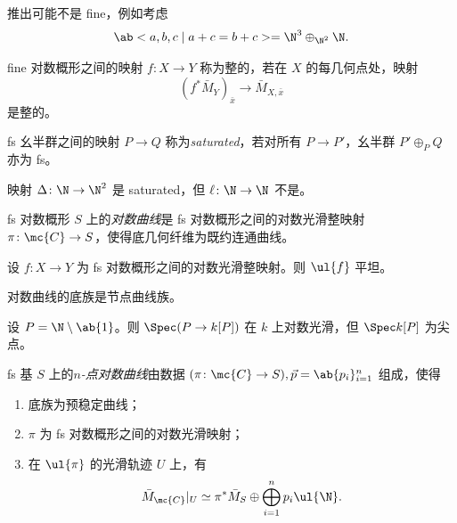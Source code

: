 \begin{exm}
    推出可能不是 fine，例如考虑
    \[ \ab< a ,b,c \mid a+c=b+c> = \N^3 \oplus_{\N^2} \N. \]
\end{exm}

\begin{defn}
    fine 对数概形之间的映射 \(f \colon X \to Y\) 称为整的，若在 \(X\) 的每几何点处，映射
    \[ (f^*\bar{M}_Y)_{\bar{x}} \to \bar{M}_{X,\bar{x}} \]
    是整的。
\end{defn}

\begin{defn}
    fs 幺半群之间的映射 \(P \to Q\) 称为\textit{saturated}，若对所有 \(P \to P'\)，幺半群 \(P' \oplus_P Q\) 亦为 fs。
\end{defn}

\begin{exm}
    映射 \(\Delta \colon \N \to \N^2\) 是 saturated，但 \(\ell \colon \N \to \N\) 不是。
\end{exm}

\begin{defn}
    fs 对数概形 \(S\) 上的\textit{对数曲线}是 fs 对数概形之间的对数光滑整映射 \(\pi \colon \mc{C} \to S\)，使得底几何纤维为既约连通曲线。
\end{defn}

\begin{prop}
    设 \(f \colon X \to Y\) 为 fs 对数概形之间的对数光滑整映射。则 \(\ul{f}\) 平坦。
\end{prop}

\begin{thm}
    对数曲线的底族是节点曲线族。
\end{thm}

\begin{exm}
    设 \(P = \N \setminus \ab\{1\}\)。则 \(\Spec (P \to k[P])\) 在 \(k\) 上对数光滑，但 \(\Spec k[P]\) 为尖点。
\end{exm}

\begin{defn}
    fs 基 \(S\) 上的\textit{\(n\)-点对数曲线}由数据 \((\pi \colon \mc{C} \to S), \vec{p} = \ab\{p_i\}_{i=1}^n\) 组成，使得
    \begin{enumerate}
        \item 底族为预稳定曲线；
        \item \(\pi\) 为 fs 对数概形之间的对数光滑映射；
        \item 在 \(\ul{\pi}\) 的光滑轨迹 \(U\) 上，有
            \[ \bar{M}_{\mc{C}}|_U \simeq \pi^* \bar{M}_S \oplus \bigoplus_{i=1}^n p_i \ul{\N}. \]
    \end{enumerate}
\end{defn}

